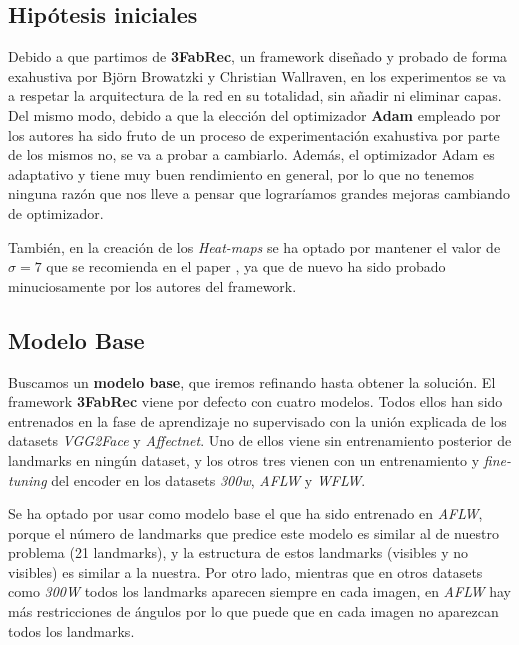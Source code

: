     \subsection{Hipótesis iniciales}
        \noindent Debido a que partimos de \textbf{3FabRec}, un framework diseñado y probado de forma exahustiva por Björn Browatzki y Christian Wallraven, en los experimentos se va a respetar la arquitectura de la red en su totalidad, sin añadir ni eliminar capas. Del mismo modo, debido a que la elección del optimizador \textbf{Adam} empleado por los autores ha sido fruto de un proceso de experimentación exahustiva por parte de los mismos no, se va a probar a cambiarlo. Además, el optimizador Adam es adaptativo y tiene muy buen rendimiento en general, por lo que no tenemos ninguna razón que nos lleve a pensar que lograríamos grandes mejoras cambiando de optimizador.

        \medskip

        \noindent También, en la creación de los \textit{Heat-maps} se ha optado por mantener el valor de $\sigma =7$ que se recomienda en el paper \cite{browatzki20203fabrec}, ya que de nuevo ha sido probado minuciosamente por los autores del framework.
    
    \subsection{Modelo Base}
        \noindent Buscamos un \textbf{modelo base}, que iremos refinando hasta obtener la solución. El framework \textbf{3FabRec} viene por defecto con cuatro modelos. Todos ellos han sido entrenados en la fase de aprendizaje no supervisado con la unión explicada de los datasets \textit{VGG2Face} y \textit{Affectnet}. Uno de ellos viene sin entrenamiento posterior de landmarks en ningún dataset, y los otros tres vienen con un entrenamiento y \textit{fine-tuning} del encoder en los datasets \textit{300w}, \textit{AFLW} y \textit{WFLW}.

        \medskip

        \noindent Se ha optado por usar como modelo base el que ha sido entrenado en \textit{AFLW}, porque el número de landmarks que predice este modelo es similar al de nuestro problema (21 landmarks), y la estructura de estos landmarks (visibles y no visibles) es similar a la nuestra. Por otro lado, mientras que en otros datasets como \textit{300W} todos los landmarks aparecen siempre en cada imagen, en \textit{AFLW} hay más restricciones de ángulos por lo que puede que en cada imagen no aparezcan todos los landmarks.

